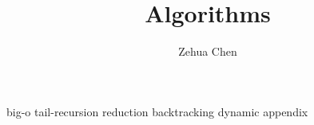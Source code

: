 \documentclass[letterpaper, 11pt]{report}
\title{Algorithms}
\author{Zehua Chen}
\begin{document}
  \maketitle
  \tableofcontents

  {big-o}
  {tail-recursion}
  {reduction}
  {backtracking}
  {dynamic}
  {appendix}
\end{document}
